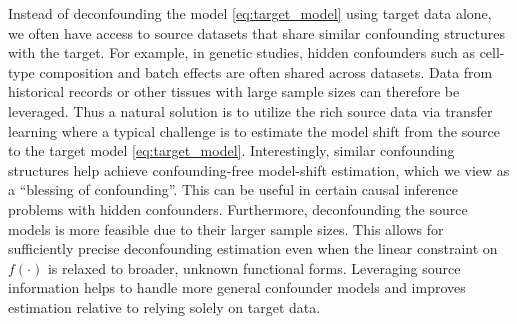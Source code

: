 \documentclass[12pt]{article}
\begin{document}
Instead of deconfounding the model \eqref{eq:target_model} using target data alone, we often have access to source datasets that share similar confounding structures with the target. For example, in genetic studies, hidden confounders such as cell-type composition and batch effects are often shared across datasets. Data from historical records or other tissues with large sample sizes can therefore be leveraged. Thus a natural solution is to utilize the rich source data via transfer learning where a typical challenge is to estimate the model shift from the source to the target model \eqref{eq:target_model}. Interestingly, similar confounding structures help achieve confounding-free model-shift estimation, which we view as a ``blessing of confounding''.  This can be useful in certain causal inference problems with hidden confounders. Furthermore, deconfounding the source models is more feasible due to their larger sample sizes. This allows for sufficiently precise deconfounding estimation even when the linear constraint on $f(\cdot)$ is relaxed to broader, unknown functional forms. Leveraging source information helps to handle more general confounder models and improves estimation relative to relying solely on target data.



\end{document}
